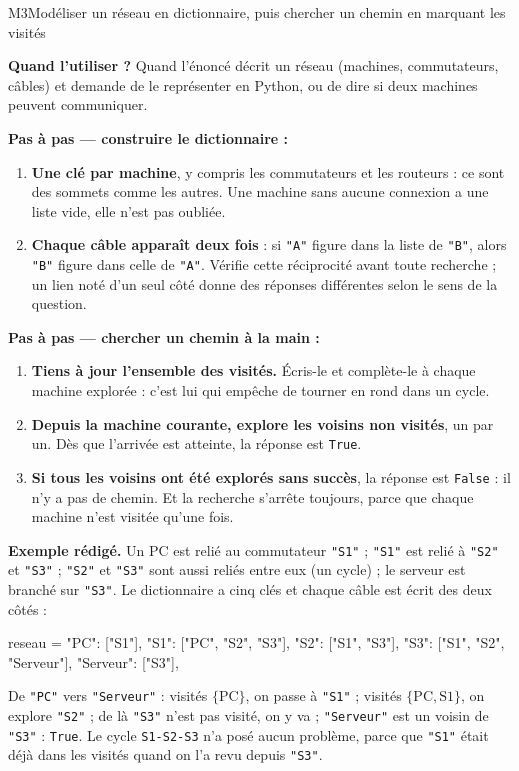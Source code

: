 \begin{fichemethode}{M3}{Modéliser un réseau en dictionnaire, puis chercher un chemin en marquant les visités}

\textbf{Quand l'utiliser ?} Quand l'énoncé décrit un réseau (machines, commutateurs,
câbles) et demande de le représenter en Python, ou de dire si deux machines peuvent
communiquer.

\textbf{Pas à pas --- construire le dictionnaire :}
\begin{enumerate}
  \item \textbf{Une clé par machine}, y compris les commutateurs et les routeurs : ce sont
        des sommets comme les autres. Une machine sans aucune connexion a une liste vide,
        elle n'est pas oubliée.
  \item \textbf{Chaque câble apparaît deux fois} : si \lstinline{"A"} figure dans la liste de
        \lstinline{"B"}, alors \lstinline{"B"} figure dans celle de \lstinline{"A"}. Vérifie
        cette réciprocité avant toute recherche ; un lien noté d'un seul côté donne des
        réponses différentes selon le sens de la question.
\end{enumerate}

\textbf{Pas à pas --- chercher un chemin à la main :}
\begin{enumerate}
  \item \textbf{Tiens à jour l'ensemble des visités.} Écris-le et complète-le à chaque
        machine explorée : c'est lui qui empêche de tourner en rond dans un cycle.
  \item \textbf{Depuis la machine courante, explore les voisins non visités}, un par un.
        Dès que l'arrivée est atteinte, la réponse est \lstinline{True}.
  \item \textbf{Si tous les voisins ont été explorés sans succès}, la réponse est
        \lstinline{False} : il n'y a pas de chemin. Et la recherche s'arrête toujours, parce
        que chaque machine n'est visitée qu'une fois.
\end{enumerate}

\textbf{Exemple rédigé.} Un PC est relié au commutateur \lstinline{"S1"} ; \lstinline{"S1"}
est relié à \lstinline{"S2"} et \lstinline{"S3"} ; \lstinline{"S2"} et \lstinline{"S3"} sont
aussi reliés entre eux (un cycle) ; le serveur est branché sur \lstinline{"S3"}. Le
dictionnaire a cinq clés et chaque câble est écrit des deux côtés :
\begin{python}
reseau = {
    "PC": ["S1"],
    "S1": ["PC", "S2", "S3"],
    "S2": ["S1", "S3"],
    "S3": ["S1", "S2", "Serveur"],
    "Serveur": ["S3"],
}
\end{python}
De \lstinline{"PC"} vers \lstinline{"Serveur"} : visités $\{\text{PC}\}$, on passe à
\lstinline{"S1"} ; visités $\{\text{PC}, \text{S1}\}$, on explore \lstinline{"S2"} ; de là
\lstinline{"S3"} n'est pas visité, on y va ; \lstinline{"Serveur"} est un voisin de
\lstinline{"S3"} : \lstinline{True}. Le cycle \lstinline{S1-S2-S3} n'a posé aucun problème,
parce que \lstinline{"S1"} était déjà dans les visités quand on l'a revu depuis \lstinline{"S3"}.


\end{fichemethode}
